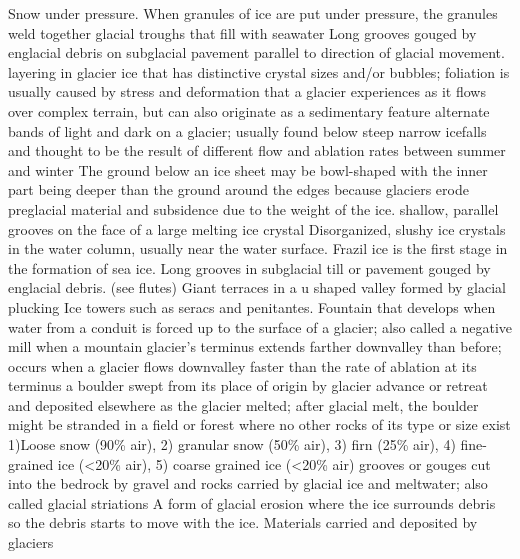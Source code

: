  Snow under pressure. When granules of ice are put under pressure, the granules weld together
 glacial troughs that fill with seawater
 Long grooves gouged by englacial debris on subglacial pavement parallel to direction of glacial movement.
 layering in glacier ice that has distinctive crystal sizes and/or bubbles; foliation is usually caused by stress and deformation that a glacier experiences as it flows over complex terrain, but can also originate as a sedimentary feature
 alternate bands of light and dark on a glacier; usually found below steep narrow icefalls and thought to be the result of different flow and ablation rates between summer and winter
 The ground below an ice sheet may be bowl-shaped with the inner part being deeper than the ground around the edges because glaciers erode preglacial material and subsidence due to the weight of the ice.
 shallow, parallel grooves on the face of a large melting ice crystal
 Disorganized, slushy ice crystals in the water column, usually near the water surface. Frazil ice is the first stage in the formation of sea ice.
 Long grooves in subglacial till or pavement gouged by englacial debris. (see flutes)
 Giant terraces in a u shaped valley formed by glacial plucking
 Ice towers such as seracs and penitantes.
 Fountain that develops when water from a conduit is forced up to the surface of a glacier; also called a negative mill
 when a mountain glacier's terminus extends farther downvalley than before; occurs when a glacier flows downvalley faster than the rate of ablation at its terminus
 a boulder swept from its place of origin by glacier advance or retreat and deposited elsewhere as the glacier melted; after glacial melt, the boulder might be stranded in a field or forest where no other rocks of its type or size exist
 1)Loose snow (90\% air), 2) granular snow (50\% air), 3) firn (25\% air), 4) fine-grained ice (<20\% air), 5) coarse grained ice (<20\% air)
 grooves or gouges cut into the bedrock by gravel and rocks carried by glacial ice and meltwater; also called glacial striations
 A form of glacial erosion where the ice surrounds debris so the debris starts to move with the ice.
 Materials carried and deposited by glaciers
